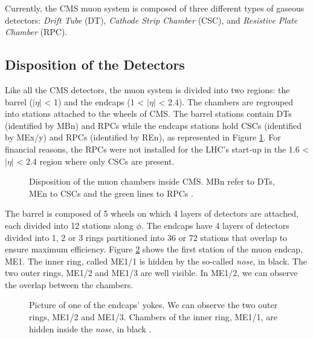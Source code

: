     		Currently, the CMS muon system \Cite{CMS_at_LHC, CMS_Performances} is composed of three different types of gaseous detectors: \emph{Drift Tube} (DT), \emph{Cathode Strip Chamber} (CSC), and \emph{Resistive Plate Chamber} (RPC).

    		\subsection{Disposition of the Detectors}
    		\label{sec:muon_chambers__disposition_of_the_detectors}

    			Like all the CMS detectors, the muon system is divided into two regions: the barrel ($ | \eta | $ < 1) and the endcaps (1 < $ | \eta | $ < 2.4). The chambers are regrouped into stations attached to the wheels of CMS. The barrel stations contain DTs (identified by MBn) and RPCs while the endcaps stations hold CSCs (identified by MEx/y) and RPCs (identified by REn), as represented in Figure \ref{fig:muon_chambers__placement}. For financial reasons, the RPCs were not installed for the LHC's start-up in the 1.6 < $ | \eta | $ < 2.4 region where only CSCs are present.

    			\begin{figure}[h!]
    				\centering
    				\caption{Disposition of the muon chambers inside CMS. MBn refer to DTs, MEn to CSCs and the green lines to RPCs \Cite{CMS_Upgrades}.}
    				\label{fig:muon_chambers__placement}
    			\end{figure}

    			The barrel is composed of 5 wheels on which 4 layers of detectors are attached, each divided into 12 stations along $ \phi $. The endcaps have 4 layers of detectors divided into 1, 2 or 3 rings partitioned into 36 or 72 stations that overlap to ensure maximum efficiency. Figure \ref{fig:muon_chambers__cms_endcap} shows the first station of the muon endcap, ME1. The inner ring, called ME1/1 is hidden by the so-called \emph{nose}, in black. The two outer rings, ME1/2 and ME1/3 are well visible. In ME1/2, we can observe the overlap between the chambers. \\

    			\begin{figure}[p!]
    				\centering
    				\caption{Picture of one of the endcaps' yokes. We can observe the two outer rings, ME1/2 and ME1/3. Chambers of the inner ring, ME1/1, are hidden inside the \emph{nose}, in black \Cite{Fig_CMS_Endcap}.}
    				\label{fig:muon_chambers__cms_endcap}
    			\end{figure}

